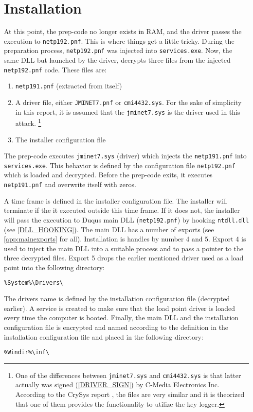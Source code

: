 \documentclass[11pt,english,a4paper]{report}
\begin{document}
\section{Installation}
At this point, the prep-code no longer exists in RAM, and the driver passes the execution to \texttt{netp192.pnf}. This is where things get a little tricky. During the preparation process, \texttt{netp192.pnf} was injected into \texttt{services.exe}. Now, the same DLL but launched by the driver, decrypts three files from the injected \texttt{netp192.pnf} code. These files are:
 \begin{enumerate}
   \item \texttt{netp191.pnf} (extracted from itself)
   \item A driver file, either \texttt{JMINET7.pnf} or \texttt{cmi4432.sys}. For the sake of simplicity in this report, it is assumed that the \texttt{jminet7.sys} is the driver used in this attack. \footnote{One of the differences between \texttt{jminet7.sys} and \texttt{cmi4432.sys} is that latter actually was signed (\ref{DRIVER_SIGN}) by C-Media Electronics Inc. According to the CrySys report \cite{DUQU_BUD}, the files are very similar and it is theorized that one of them provides the functionality to utilize the key logger.}
   \item The installer configuration file
  \end{enumerate}
{\raggedright
The prep-code executes \texttt{jminet7.sys} (driver) which injects the \texttt{netp191.pnf} into \texttt{services.exe}. This behavior is defined by the configuration file \texttt{netp192.pnf} which is loaded and decrypted. Before the prep-code exits, it executes \texttt{netp191.pnf} and overwrite itself with zeros. 
\par}
A time frame is defined in the installer configuration file. The installer will terminate if the it executed outside this time frame. If it does not, the installer will pass the execution to Duqus main DLL (\texttt{netp192.pnf}) by hooking \texttt{ntdll.dll} (see \ref{DLL_HOOKING}). The main DLL has a number of exports (see \ref{app:mainexports} for all). Installation is handles by number 4 and 5. Export 4 is used to inject the main DLL into a suitable process and to pass a pointer to the three decrypted files. Export 5 drops the earlier mentioned driver used as a load point into the following directory:
\begin{lstlisting}
%System%\Drivers\ 
\end{lstlisting}
The drivers name is defined by the installation configuration file (decrypted earlier). A service is created to make sure that the load point driver is loaded every time the computer is booted. Finally, the main DLL and the installation configuration file is encrypted and named according to the definition in the installation configuration file and placed in the following directory:
\begin{lstlisting}
%Windir%\inf\ 
\end{lstlisting}
\end{document}
